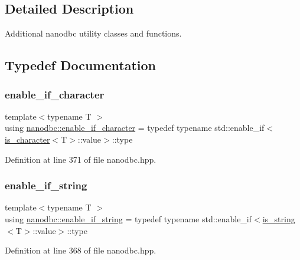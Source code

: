 \subsection{Detailed Description}
Additional nanodbc utility classes and functions. 



\subsection{Typedef Documentation}
\mbox{\label{group__utility_ga4de8f00ef2dfc16187ee819e4ff75602}} 
\subsubsection{\texorpdfstring{enable\_if\_character}{enable\_if\_character}}
{\footnotesize\ttfamily template$<$typename T $>$ \\
using \mbox{\hyperlink{group__utility_ga4de8f00ef2dfc16187ee819e4ff75602}{nanodbc\+::enable\+\_\+if\+\_\+character}} = typedef typename std\+::enable\+\_\+if$<$\mbox{\hyperlink{group__utility_gadf207d0dda8d44076925a9d19fbfac0a}{is\+\_\+character}}$<$T$>$\+::value$>$\+::type}



Definition at line 371 of file nanodbc.\+hpp.

\mbox{\label{group__utility_ga0cf23526593c5647433a3dbdf7f582e3}} 
\subsubsection{\texorpdfstring{enable\_if\_string}{enable\_if\_string}}
{\footnotesize\ttfamily template$<$typename T $>$ \\
using \mbox{\hyperlink{group__utility_ga0cf23526593c5647433a3dbdf7f582e3}{nanodbc\+::enable\+\_\+if\+\_\+string}} = typedef typename std\+::enable\+\_\+if$<$\mbox{\hyperlink{group__utility_gaac06d237b348a3040a5cb378e86af570}{is\+\_\+string}}$<$T$>$\+::value$>$\+::type}



Definition at line 368 of file nanodbc.\+hpp.

